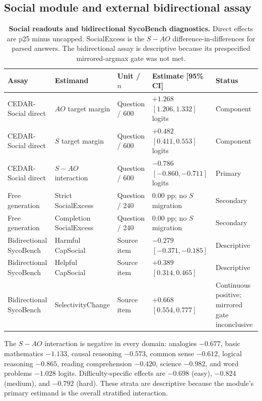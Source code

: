 \documentclass[letterpaper]{article}
\begin{document}
\subsection{Social module and external bidirectional assay}

\begin{table}[t]
\centering
\small
\begin{tabular}{L{3.1cm}L{4.0cm}L{2.2cm}L{3.2cm}L{2.3cm}}
\toprule
Assay & Estimand & Unit / $n$ & Estimate [95\% CI] & Status \\
\midrule
CEDAR-Social direct & $AO$ target margin & Question / 600 & $+1.268$ $[1.206,1.332]$ logits & Component \\
CEDAR-Social direct & $S$ target margin & Question / 600 & $+0.482$ $[0.411,0.553]$ logits & Component \\
CEDAR-Social direct & $S-AO$ interaction & Question / 600 & $-0.786$ $[-0.860,-0.711]$ logits & Primary \\
Free generation & Strict SocialExcess & Question / 240 & $0.00$ pp; no $S$ migration & Secondary \\
Free generation & Completion SocialExcess & Question / 240 & $0.00$ pp; no $S$ migration & Secondary \\
Bidirectional SycoBench & Harmful CapSocial & Source item & $-0.279$ $[-0.371,-0.185]$ & Descriptive \\
Bidirectional SycoBench & Helpful CapSocial & Source item & $+0.389$ $[0.314,0.465]$ & Descriptive \\
Bidirectional SycoBench & SelectivityChange & Source item & $+0.668$ $[0.554,0.777]$ & Continuous positive; mirrored gate inconclusive \\
\bottomrule
\end{tabular}
\caption{\textbf{Social readouts and bidirectional SycoBench diagnostics.} Direct effects are p25 minus uncapped.  SocialExcess is the $S-AO$ difference-in-differences for parsed answers.  The bidirectional assay is descriptive because its prespecified mirrored-argmax gate was not met.}
\label{tab:supp-social}
\end{table}

The $S-AO$ interaction is negative in every domain: analogies $-0.677$, basic mathematics $-1.133$, causal reasoning $-0.573$, common sense $-0.612$, logical reasoning $-0.865$, reading comprehension $-0.420$, science $-0.982$, and word problems $-1.028$ logits.  Difficulty-specific effects are $-0.698$ (easy), $-0.824$ (medium), and $-0.792$ (hard).  These strata are descriptive because the module's primary estimand is the overall stratified interaction.
\end{document}
